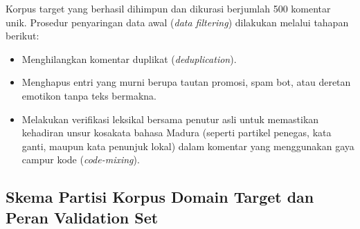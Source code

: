 Korpus target yang berhasil dihimpun dan dikurasi berjumlah 500 komentar unik. Prosedur penyaringan data awal (\textit{data filtering}) dilakukan melalui tahapan berikut:
\begin{itemize}
    \item Menghilangkan komentar duplikat (\textit{deduplication}).
    \item Menghapus entri yang murni berupa tautan promosi, spam bot, atau deretan emotikon tanpa teks bermakna.
    \item Melakukan verifikasi leksikal bersama penutur asli untuk memastikan kehadiran unsur kosakata bahasa Madura (seperti partikel penegas, kata ganti, maupun kata penunjuk lokal) dalam komentar yang menggunakan gaya campur kode (\textit{code-mixing}).
\end{itemize}

\subsection{Skema Partisi Korpus Domain Target dan Peran Validation Set}

